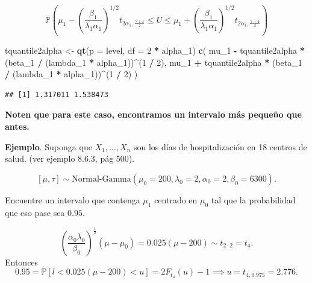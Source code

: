 \documentclass[
  12pt,
]{book}
\newenvironment{Shaded}{\begin{snugshade}}{\end{snugshade}}
\newcommand{\DataTypeTok}[1]{\textcolor[rgb]{0.13,0.29,0.53}{#1}}
\newcommand{\DecValTok}[1]{\textcolor[rgb]{0.00,0.00,0.81}{#1}}
\newcommand{\KeywordTok}[1]{\textcolor[rgb]{0.13,0.29,0.53}{\textbf{#1}}}
\newcommand{\NormalTok}[1]{#1}
\newcommand{\OperatorTok}[1]{\textcolor[rgb]{0.81,0.36,0.00}{\textbf{#1}}}
\newcommand{\StringTok}[1]{\textcolor[rgb]{0.31,0.60,0.02}{#1}}
\begin{document}
\begin{equation*}
\mathbb P \left(\mu_1 - \left(\dfrac{\beta_1}{\lambda_1\alpha_1}\right)^{1/2}
t_{2\alpha_1, \tfrac{\gamma+1}{2}} 
\leq U 
\leq \mu_1 + \left(\dfrac{\beta_1}{\lambda_1\alpha_1}\right)^{1/2} t_{2\alpha_1, \tfrac{\gamma+1}{2}}\right)
\end{equation*}

\begin{Shaded}
\begin{Highlighting}[]
\NormalTok{tquantile2alpha \textless{}{-}}\StringTok{ }\KeywordTok{qt}\NormalTok{(}\DataTypeTok{p =}\NormalTok{ level, }\DataTypeTok{df =} \DecValTok{2} \OperatorTok{*}\StringTok{ }\NormalTok{alpha\_}\DecValTok{1}\NormalTok{)}
\KeywordTok{c}\NormalTok{(}
\NormalTok{  mu\_}\DecValTok{1} \OperatorTok{{-}}\StringTok{ }\NormalTok{tquantile2alpha }\OperatorTok{*}\StringTok{ }\NormalTok{(beta\_}\DecValTok{1} \OperatorTok{/}\StringTok{ }\NormalTok{(lambda\_}\DecValTok{1} \OperatorTok{*}\StringTok{ }\NormalTok{alpha\_}\DecValTok{1}\NormalTok{))}\OperatorTok{\^{}}\NormalTok{(}\DecValTok{1} \OperatorTok{/}\StringTok{ }\DecValTok{2}\NormalTok{),}
\NormalTok{  mu\_}\DecValTok{1} \OperatorTok{+}\StringTok{ }\NormalTok{tquantile2alpha }\OperatorTok{*}\StringTok{ }\NormalTok{(beta\_}\DecValTok{1} \OperatorTok{/}\StringTok{ }\NormalTok{(lambda\_}\DecValTok{1} \OperatorTok{*}\StringTok{ }\NormalTok{alpha\_}\DecValTok{1}\NormalTok{))}\OperatorTok{\^{}}\NormalTok{(}\DecValTok{1} \OperatorTok{/}\StringTok{ }\DecValTok{2}\NormalTok{)}
\NormalTok{)}
\end{Highlighting}
\end{Shaded}

\begin{verbatim}
## [1] 1.317011 1.538473
\end{verbatim}

\textbf{Noten que para este caso, encontramos un intervalo más pequeño que antes. }

\textbf{Ejemplo}. Suponga que \(X_1,\dots,X_{n}\) son los días de hospitalización en 18 centros de salud. (ver ejemplo 8.6.3, pág 500).

\[[\mu,\tau]\sim \text{Normal-Gamma}(\mu_0=200,\lambda_0=2,\alpha_0=2,\beta_0=6300).\]

Encuentre un intervalo que contenga \(\mu_1\) centrado en \(\mu_0\) tal que la probabilidad que eso pase sea \(0.95\).

\[\left(\dfrac{\alpha_0\lambda_0}{\beta_0}\right)^{\frac 12}(\mu-\mu_0) = 0.025(\mu - 200)\sim t_{2\cdot2} = t_4.\]
Entonces
\[0.95 = \mathbb P[l<0.025(\mu-200)<u] = 2F_{t_4}(u)-1 \implies u = t_{4,0.975} = 2.776.\]
\end{document}
